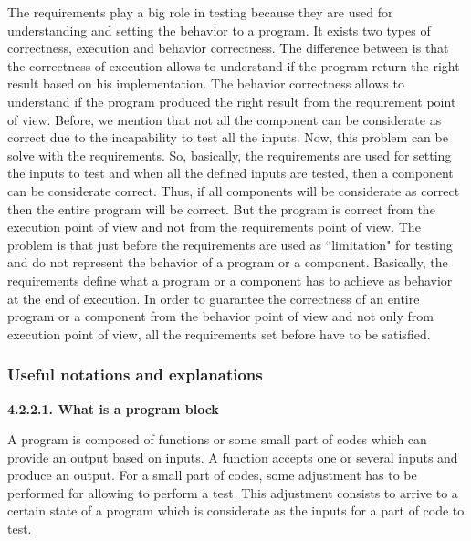 \documentclass[conference,compsoc]{IEEEtran}
\begin{document}
The requirements play a big role in testing because they are used for understanding and setting the behavior to a program. 
\newline
It exists two types of correctness, execution and behavior correctness. The difference between is that the correctness of execution allows to understand if the program return the right result based on his implementation. The behavior correctness allows to understand if the program produced the right result from the requirement point of view. 
\newline
Before, we mention that not all the component can be considerate as correct due to the incapability to test all the inputs. Now, this problem can be solve with the requirements. So, basically, the requirements are used for setting the inputs to test and when all the defined inputs are tested, then a component can be considerate correct. 
\newline
Thus, if all components will be considerate as correct then the entire program will be correct. But the program is correct from the execution point of view and not from the requirements point of view. 
\newline
The problem is that just before the requirements are used as ``limitation" for testing and do not represent the behavior of a program or a component. Basically, the requirements define what a program or a component has to achieve as behavior at the end of execution. In order to guarantee the correctness of an entire program or a component from the behavior point of view and not only from execution point of view, all the requirements set before have to be satisfied. 

\subsubsection{Useful notations and explanations}
\noindent
\newline\newline  
\textbf{4.2.2.1. What is a program block}
\newline

A program is composed of functions or some small part of codes which can provide an output based on inputs. A function accepts one or several inputs and produce an output. 
\newline
For a small part of codes, some adjustment has to be performed for allowing to perform a test. This adjustment consists to arrive to a certain state of a program which is considerate as the inputs for a part of code to test. 
\end{document}
